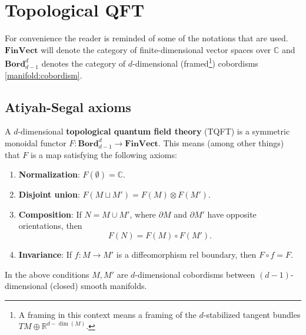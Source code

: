 \section{Topological QFT}

    For convenience the reader is reminded of some of the notations that are used. $\mathbf{FinVect}$ will denote the category of finite-dimensional vector spaces over $\mathbb{C}$ and $\mathbf{Bord}^d_{d-1}$ denotes the category of $d$-dimensional (framed\footnote{A framing in this context means a framing of the $d$-stabilized tangent bundles $TM\oplus\mathbb{R}^{d-\dim(M)}$.}) cobordisms \ref{manifold:cobordism}.

\subsection{Atiyah-Segal axioms}

    \begin{axiom}
        A $d$-dimensional \textbf{topological quantum field theory} (TQFT) is a symmetric monoidal functor $F:\mathbf{Bord}_{d-1}^d\rightarrow\mathbf{FinVect}$. This means (among other things) that $F$ is a map satisfying the following axioms:
        \begin{enumerate}
            \item\textbf{Normalization}: $F(\emptyset)=\mathbb{C}$.
            \item\textbf{Disjoint union}: $F(M\sqcup M') = F(M)\otimes F(M')$.
            \item\textbf{Composition}: If $N=M\cup M'$, where $\partial M$ and $\partial M'$ have opposite orientations, then \[F(N) = F(M)\circ F(M').\]
            \item\textbf{Invariance}: If $f: M\rightarrow M'$ is a diffeomorphism rel boundary, then $F\circ f = F$.
        \end{enumerate}
        In the above conditions $M,M'$ are $d$-dimensional cobordisms between $(d-1)$-dimensional (closed) smooth manifolds.
    \end{axiom}

